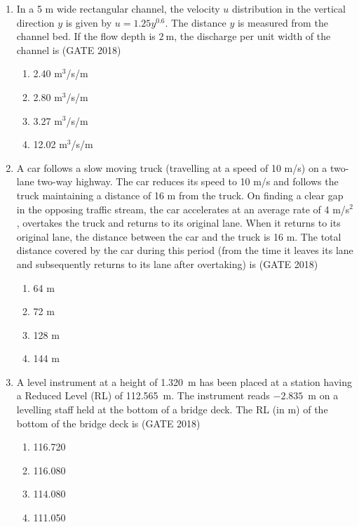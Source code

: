 \documentclass[journal,12pt,onecolumn]{IEEEtran}
\theoremstyle{remark}
\begin{document}
\begin{enumerate}
\item In a 5 m wide rectangular channel, the velocity $u$ distribution in the vertical direction $y$ is given by $u=1.25y^{0.6}$. The distance $y$ is measured from the channel bed. If the flow depth is $2~$m, the discharge per unit width of the channel is
\hfill{(GATE 2018)}
\begin{multicols}{4}
\begin{enumerate}
    \item 2.40 m$^3$/s/m
    \item 2.80 m$^3$/s/m
    \item 3.27 m$^3$/s/m
    \item 12.02 m$^3$/s/m
\end{enumerate}
\end{multicols}
\vspace{1cm}

\item A car follows a slow moving truck (travelling at a speed of 10 m/s) on a two-lane two-way highway. The car reduces its speed to 10 m/s and follows the truck maintaining a distance of 16 m from the truck. On finding a clear gap in the opposing traffic stream, the car accelerates at an average rate of 4 m/s$^2$, overtakes the truck and returns to its original lane. When it returns to its original lane, the distance between the car and the truck is 16 m. The total distance covered by the car during this period (from the time it leaves its lane and subsequently returns to its lane after overtaking) is
\hfill{(GATE 2018)}
\begin{multicols}{4}
\begin{enumerate}
    \item 64 m
    \item 72 m
    \item 128 m
    \item 144 m
\end{enumerate}
\end{multicols}
\vspace{1cm}

\item A level instrument at a height of 1.320~m has been placed at a station having a Reduced Level (RL) of 112.565~m. The instrument reads $-2.835$~m on a levelling staff held at the bottom of a bridge deck. The RL (in m) of the bottom of the bridge deck is
\hfill{(GATE 2018)}
\begin{multicols}{4}
\begin{enumerate}
    \item 116.720
    \item 116.080
    \item 114.080
    \item 111.050
\end{enumerate}
\end{multicols}
\vspace{1cm}


\end{enumerate}
\end{document}
